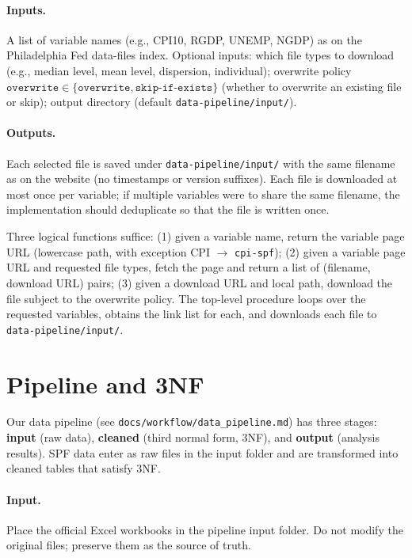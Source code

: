 \documentclass[11pt]{article}
\begin{document}
\paragraph{Inputs.}
A list of variable names (e.g., CPI10, RGDP, UNEMP, NGDP) as on the
Philadelphia Fed data-files index. Optional inputs: which file types to
download (e.g., median level, mean level, dispersion, individual); overwrite
policy $\texttt{overwrite} \in \{\texttt{overwrite}, \texttt{skip-if-exists}\}$
(whether to overwrite an existing file or skip); output directory (default
\texttt{data-pipeline/input/}).

\paragraph{Outputs.}
Each selected file is saved under \texttt{data-pipeline/input/} with the same
filename as on the website (no timestamps or version suffixes). Each file is
downloaded at most once per variable; if multiple variables were to share the
same filename, the implementation should deduplicate so that the file is
written once.

Three logical functions suffice: (1) given a variable name, return the variable
page URL (lowercase path, with exception CPI $\to$ \texttt{cpi-spf}); (2) given
a variable page URL and requested file types, fetch the page and return a list
of (filename, download URL) pairs; (3) given a download URL and local path,
download the file subject to the overwrite policy. The top-level procedure
loops over the requested variables, obtains the link list for each, and
downloads each file to \texttt{data-pipeline/input/}.

\section{Pipeline and 3NF}

Our data pipeline (see \texttt{docs/workflow/data\_pipeline.md}) has three
stages: \textbf{input} (raw data), \textbf{cleaned} (third normal form, 3NF),
and \textbf{output} (analysis results). SPF data enter as raw files in the
input folder and are transformed into cleaned tables that satisfy 3NF.

\paragraph{Input.}
Place the official Excel workbooks in the pipeline input folder. Do not
modify the original files; preserve them as the source of truth.
\end{document}
